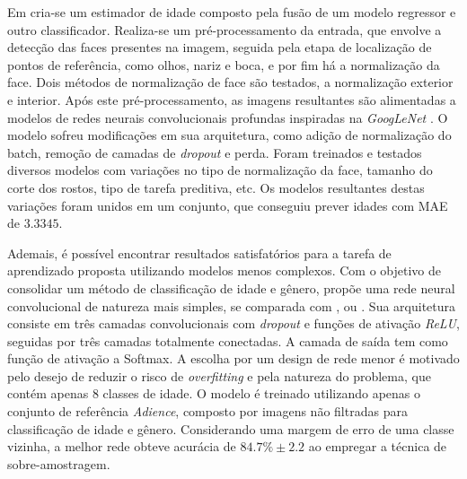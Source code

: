 Em \cite{liu2015agenet} cria-se um estimador de idade composto pela fusão de um modelo regressor e outro classificador. Realiza-se um pré-processamento da entrada, que envolve a detecção das faces presentes na imagem, seguida pela etapa de localização de pontos de referência, como olhos, nariz e boca, e por fim há a normalização da face. Dois métodos de normalização de face são testados, a normalização exterior e interior. Após este pré-processamento, as imagens resultantes são alimentadas a modelos de redes neurais convolucionais profundas inspiradas na \emph{GoogLeNet} \cite{inception}. O modelo sofreu modificações em sua arquitetura, como adição de normalização do batch, remoção de camadas de \emph{dropout} e perda. Foram treinados e testados diversos modelos com variações no tipo de normalização da face, tamanho do corte dos rostos, tipo de tarefa preditiva, etc. Os modelos resultantes destas variações foram unidos em um conjunto, que conseguiu prever idades com MAE de $3.3345$.

Ademais, é possível encontrar resultados satisfatórios para a tarefa de aprendizado proposta utilizando modelos menos complexos. Com o objetivo de consolidar um método de classificação de idade e gênero, \cite{levi2015age} propõe uma rede neural convolucional de natureza mais simples, se comparada com \cite{inception}, \cite{vggnet} ou \cite{resnet}. Sua arquitetura consiste em três camadas convolucionais com \emph{dropout} e funções de ativação \emph{ReLU}, seguidas por três camadas totalmente conectadas. A camada de saída tem como função de ativação a Softmax. A escolha por um design de rede menor é motivado pelo desejo de reduzir o risco de \emph{overfitting} e pela natureza do problema, que contém apenas 8 classes de idade. O modelo é treinado utilizando apenas o conjunto de referência \emph{Adience}, composto por imagens não filtradas para classificação de idade e gênero. Considerando uma margem de erro de uma classe vizinha, a melhor rede obteve acurácia de $84.7\% \pm 2.2$ ao empregar a técnica de sobre-amostragem.

